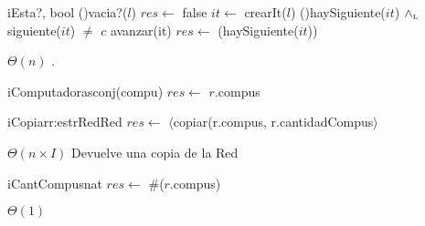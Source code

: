 \begin{Algoritmos}
  \begin{algoritmo}{iEsta?}{, }{bool}
    \eIf(){vacia?($l$)}{
      $res \gets$ false
    }{
     $it \gets$ crearIt($l$)
      \While(){haySiguiente($it$) $\land_{\mathrm{\scriptscriptstyle{L}}}$ siguiente($it$) $\neq$ $c$}{
        avanzar(it)
      }
    }
    $res \gets$ (haySiguiente($it$))
  \end{algoritmo}
  {} %
  {} %
  {$\Theta(n)$} %
  {.} %

  \nuevoAlgo
  \begin{algoritmo}{iComputadoras}{}{conj(compu)}{}
    $res \gets$ $r$.compus
  \end{algoritmo}
  \datosAlgoritmo{} %
  {} %
  {} %
  {} %
  {} %
   
  \begin{algoritmo}{iCopiar}{\In r:estrRed}{Red}
   	$res \gets$ $\langle$copiar(r.compus, r.cantidadCompus$\rangle$
  \end{algoritmo}
  \datosAlgoritmo{} %
  {} %
  {} %
  {$\Theta(n \times I)$} %
  {Devuelve una copia de la Red} %

  \nuevoAlgo
  \begin{algoritmo}{iCantCompus}{}{nat}
    $res \gets$ $\#$($r$.compus) 
  \end{algoritmo}   
  \datosAlgoritmo{} %
  {} %
  {} %
  {$\Theta(1)$} %
  {} %

\end{Algoritmos}
